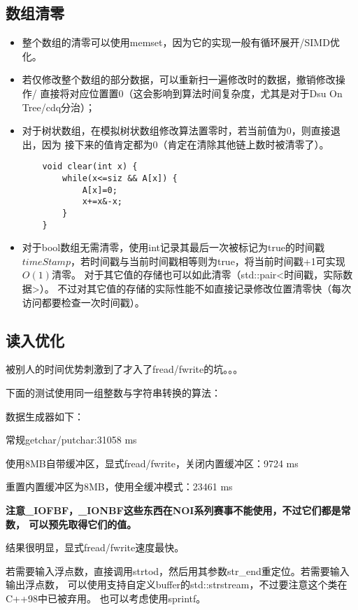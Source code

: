 \subsection{数组清零}
\begin{itemize}
    \item 整个数组的清零可以使用memset，因为它的实现一般有循环展开/SIMD优化。
    \item 若仅修改整个数组的部分数据，可以重新扫一遍修改时的数据，撤销修改操作/
    直接将对应位置置0（这会影响到算法时间复杂度，尤其是对于Dsu On Tree/cdq分治）；
    \item 对于树状数组，在模拟树状数组修改算法置零时，若当前值为0，则直接退出，因为
    接下来的值肯定都为0（肯定在清除其他链上数时被清零了）。
    \begin{lstlisting}
    void clear(int x) {
        while(x<=siz && A[x]) {
            A[x]=0;
            x+=x&-x;
        }
    }
    \end{lstlisting}
    \item 对于bool数组无需清零，使用int记录其最后一次被标记为true的时间戳
    $timeStamp$，若时间戳与当前时间戳相等则为true，将当前时间戳+1可实现$O(1)$清零。
    对于其它值的存储也可以如此清零（std::pair<时间戳，实际数据>）。
    不过对其它值的存储的实际性能不如直接记录修改位置清零快（每次访问都要检查一次时间戳）。
\end{itemize}
\subsection{读入优化}
被别人的时间优势刺激到了才入了fread/fwrite的坑。。。

下面的测试使用同一组整数与字符串转换的算法：


数据生成器如下：


常规getchar/putchar:31058 ms


使用8MB自带缓冲区，显式fread/fwrite，关闭内置缓冲区：9724 ms


重置内置缓冲区为8MB，使用全缓冲模式：23461 ms


{\bfseries 注意\_IOFBF，\_IONBF这些东西在NOI系列赛事不能使用，不过它们都是常数，
可以预先取得它们的值。}

结果很明显，显式fread/fwrite速度最快。

若需要输入浮点数，直接调用strtod，然后用其参数str\_end重定位。若需要输入输出浮点数，
可以使用支持自定义buffer的std::strstream，不过要注意这个类在C++98中已被弃用。
也可以考虑使用sprintf。

